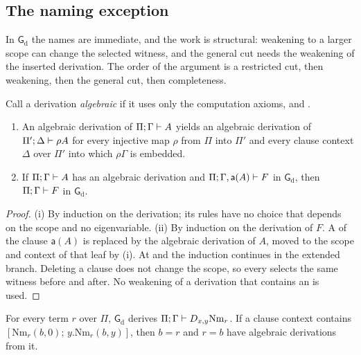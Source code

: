 \subsection{The naming exception}

In $\mathsf{G}_{\mathrm d}$ the names are immediate, and the work is
structural: weakening to a larger scope can change the selected witness, and
the general cut needs the weakening of the inserted derivation.  The order
of the argument is a restricted cut, then weakening, then the general cut,
then completeness.

\begin{lemma}
\label{wit:lem:algebraic}
Call a derivation \emph{algebraic} if it uses only the computation axioms,
 and .
\begin{enumerate}[label=\textup{(\roman*)}]
\item An algebraic derivation of $\Pi;\Gamma\vdash A$ yields an algebraic
 derivation of $\Pi';\Delta\vdash\rho A$ for every injective map $\rho$
 from $\Pi$ into $\Pi'$ and every clause context $\Delta$ over $\Pi'$ into
 which $\rho\Gamma$ is embedded.
\item If $\Pi;\Gamma\vdash A$ has an algebraic derivation and
 $\Pi;\Gamma,\mathsf{a}(A)\vdash F$ in $\mathsf{G}_{\mathrm d}$, then
 $\Pi;\Gamma\vdash F$ in $\mathsf{G}_{\mathrm d}$.
\end{enumerate}
\end{lemma}

\begin{proof}
(i) By induction on the derivation; its rules have no choice that depends
on the scope and no eigenvariable.  (ii) By induction on the derivation of
$F$.  A  of the clause $\mathsf{a}(A)$ is replaced by the
algebraic derivation of $A$, moved to the scope and context of that leaf by
(i).  At  and  the induction continues in
the extended branch.  Deleting a clause does not change the scope, so every
 selects the same witness before and after.  No weakening
of a derivation that contains an  is used.
\end{proof}

\begin{lemma}
\label{wit:lem:gd-name}
For every term $r$ over $\Pi$, $\mathsf{G}_{\mathrm d}$ derives
$\Pi;\Gamma\vdash D_{x,y}\mathrm{Nm}_r$.  If a clause context contains
$[\mathrm{Nm}_r(b,0);\,y.\mathrm{Nm}_r(b,y)]$, then $b=r$ and $r=b$ have
algebraic derivations from it.
\end{lemma}

